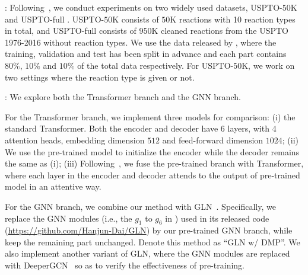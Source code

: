 \documentclass{article}
\begin{document}
: Following~\citep{GLN,G2Gs,NEURIPS2020_819f46e5}, we conduct experiments on two widely used  datasets, USPTO-$50$K \citep{liu2017retrosynthetic,coley2017computer} and USPTO-full \citep{GLN,NEURIPS2020_819f46e5}. USPTO-$50$K consists of $50$K reactions with 10 reaction types in total, and USPTO-full consists of $950$K cleaned reactions from the USPTO 1976-2016 without reaction types. We use the data released by \cite{GLN}, where the training, validation and test has been split in advance and each part contains $80\%$, $10\%$ and $10\%$ of the total data respectively.
For USPTO-$50$K, we work on two settings where the reaction type is given or not.

: We explore both the Transformer branch and the GNN branch.



For the Transformer branch, we implement three models for comparison: (i) the standard Transformer. Both the encoder and decoder have $6$ layers, with $4$ attention heads, embedding dimension $512$ and feed-forward dimension $1024$; (ii) We use the pre-trained model to initialize the encoder while the decoder remains the same as (i); (iii) Following~\cite{zhu2020incorporating}, we fuse the pre-trained branch with Transformer, where each layer in the encoder and decoder attends to the output of pre-trained model in an attentive way. 

For the GNN branch, we combine our method with GLN~\citep{GLN}. Specifically, we replace the GNN modules (i.e., the $g_1$ to $g_6$ in \citep{GLN}) used in its released code (\url{https://github.com/Hanjun-Dai/GLN}) by our pre-trained GNN branch, while keep the remaining part unchanged. Denote this method as ``GLN w/ DMP''.  We also implement another variant of GLN, where the GNN modules are replaced with DeeperGCN~\citep{li2020deepergcn} so as to verify the effectiveness of pre-training. 
\end{document}
